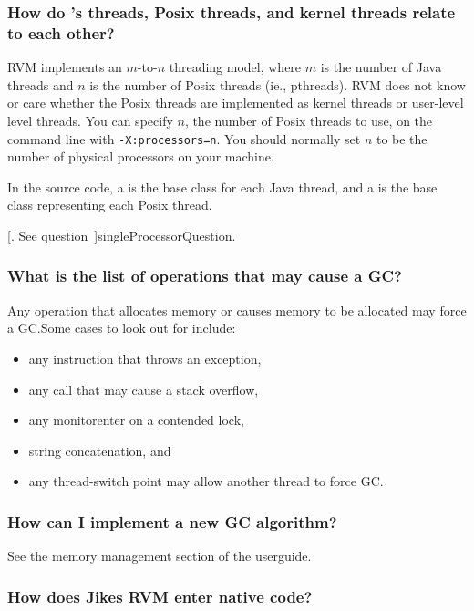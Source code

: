 \subsubsection{How do \jrvm{}'s threads, Posix threads, and kernel
threads relate to each other?}

RVM implements an $m$-to-$n$ threading model, where $m$ is the number of 
Java threads and $n$ is the number of Posix threads (ie., pthreads).  RVM
does not know or care whether the Posix threads are implemented as kernel
threads or user-level level threads.  You can specify $n$, the number of
Posix threads to use, on the command line with {\tt -X:processors=n}.
You should normally set $n$ to be the number of physical processors on
your machine.  

In the source code, a 
is the base class for each Java
thread, and a 
is the base class representing each
Posix thread.  

[.  See 
question~\Ref]{singleProcessorQuestion}.

\subsubsection{What is the list of operations that may cause a GC?}

Any operation that allocates memory or causes memory to be allocated may
force a GC.\@  Some cases to look out for include:
\begin{itemize}
\item any instruction that throws an exception,
\item any call that may cause a stack overflow,
\item any monitorenter on a contended lock,
\item string concatenation, and
\item any thread-switch point may allow another thread to force GC.\@
\end{itemize}

\subsubsection{How can I implement a new GC algorithm?}

See the memory management section of the userguide.

\subsubsection{How does Jikes RVM enter native code?}

